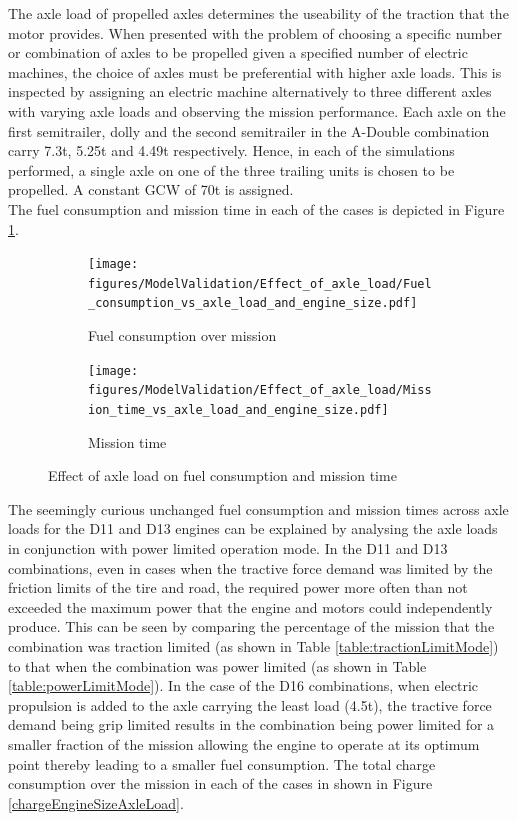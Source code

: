 \documentclass[ExampleMasters.tex]{subfiles}
\begin{document}
The axle load of propelled axles determines the useability of the traction that the motor provides. When presented with the problem of choosing a specific number or combination of axles to be propelled given a specified number of electric machines, the choice of axles must be preferential with higher axle loads. This is inspected by assigning an electric machine alternatively to three different axles with varying axle loads and observing the mission performance. Each axle on the first semitrailer, dolly and the second semitrailer in the A-Double combination carry 7.3t, 5.25t and 4.49t respectively. Hence, in each of the simulations performed, a single axle on one of the three trailing units is chosen to be propelled. A constant GCW of 70t is assigned.\\

The fuel consumption and mission time in each of the cases is depicted in Figure \ref{fuelTimeEngineAxleLoad}. 

\begin{figure}[h!]
\begin{subfigure}{.5\textwidth}
	\centering
	\texttt{[image: figures/ModelValidation/Effect\_of\_axle\_load/Fuel\_consumption\_vs\_axle\_load\_and\_engine\_size.pdf]}
	\caption{Fuel consumption over mission}
\end{subfigure}
\begin{subfigure}{.5\textwidth}
	\centering
	\texttt{[image: figures/ModelValidation/Effect\_of\_axle\_load/Mission\_time\_vs\_axle\_load\_and\_engine\_size.pdf]}
	\caption{Mission time}
\end{subfigure}
\caption{Effect of axle load on fuel consumption and mission time}
\label{fuelTimeEngineAxleLoad}
\end{figure}

The seemingly curious unchanged fuel consumption and mission times across axle loads for the D11 and D13 engines can be explained by analysing the axle loads in conjunction with power limited operation mode. In the D11 and D13 combinations, even in cases when the tractive force demand was limited by the friction limits of the tire and road, the required power more often than not exceeded the maximum power that the engine and motors could independently produce. This can be seen by comparing the percentage of the mission that the combination was traction limited (as shown in Table \ref{table:tractionLimitMode}) to that when the combination was power limited (as shown in Table \ref{table:powerLimitMode}). In the case of the D16 combinations, when electric propulsion is added to the axle carrying the least load (4.5t), the tractive force demand being grip limited results in the combination being power limited for a smaller fraction of the mission allowing the engine to operate at its optimum point thereby leading to a smaller fuel consumption. The total charge consumption over the mission in each of the cases in shown in Figure \ref{chargeEngineSizeAxleLoad}.\\
\end{document}
